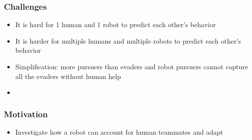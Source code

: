 \subsubsection{Challenges}
\begin{itemize}
    \item It is hard for 1 human and 1 robot to predict each other's behavior
    \item It is harder for multiple humans and multiple robots to predict each other's behavior
    \item Simplification: more pursuers than evaders and robot pursuers cannot capture all the evaders without human help
    \item {}
\end{itemize}

\subsubsection{Motivation}
\begin{itemize}
    \item Investigate how a robot can account for human teammates and adapt
\end{itemize}
